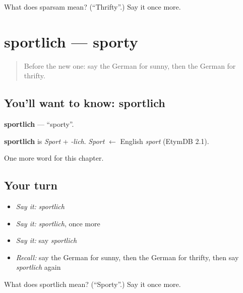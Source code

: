 \begin{tcolorbox}[breakable,colback=teal!4,colframe=teal!35!black,title={Before you move on}]
What does sparsam mean? (\textquotedblleft{}Thrifty\textquotedblright{}.) Say it once more.
\end{tcolorbox}
\section[sportlich]{sportlich — sporty}

\label{lesson:GE-C222-sportlich}



\begin{quote}
Before the new one: say the German for sunny, then the German for thrifty.
\end{quote}

\subsection*{You'll want to know: sportlich}
\textbf{sportlich} — \textquotedblleft{}sporty\textquotedblright{}.

\begin{cousinweb}
\textbf{sportlich} is \emph{Sport} + \emph{-lich}. \emph{Sport} $\leftarrow$ English \emph{sport} (EtymDB 2.1).
\end{cousinweb}

\begin{grammarlens}[title={What you've built}]
One more word for this chapter.
\end{grammarlens}

\subsection*{Your turn}
\begin{itemize}
\raggedright
  \item \emph{Say it:} \emph{sportlich}
  \item \emph{Say it:} \emph{sportlich}, once more
  \item \emph{Say it:} say \emph{sportlich}
  \item \emph{Recall:} say the German for sunny, then the German for thrifty, then say \emph{sportlich} again
\end{itemize}

\begin{tcolorbox}[breakable,colback=teal!4,colframe=teal!35!black,title={Before you move on}]
What does sportlich mean? (\textquotedblleft{}Sporty\textquotedblright{}.) Say it once more.
\end{tcolorbox}
